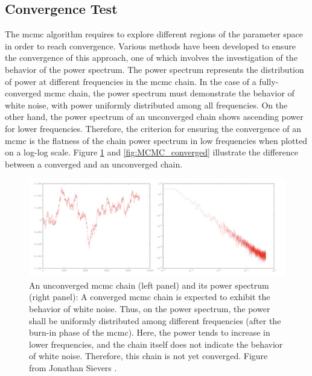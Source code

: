 \documentclass[12pt, TexShade, letterpaper]{report}
\begin{document}
\subsection{Convergence Test}
\label{chap:method,sub:mcmc,subsub:convergence}
The \gls{mcmc} algorithm requires to explore different regions of the parameter space in order to reach convergence. Various methods have been developed to ensure the convergence of this approach, one of which involves the investigation of the behavior of the power spectrum. The power spectrum represents the distribution of power at different frequencies in the \gls{mcmc} chain. In the case of a fully-converged \gls{mcmc} chain, the power spectrum must demonstrate the behavior of white noise, with power uniformly distributed among all frequencies. On the other hand, the power spectrum of an unconverged chain shows ascending power for lower frequencies. Therefore, the criterion for ensuring the convergence of an \gls{mcmc} is the flatness of the chain power spectrum in low frequencies when plotted on a log-log scale. Figure \ref{fig:MCMC_unconverged} and \ref{fig:MCMC_converged} illustrate the difference between a converged and an unconverged chain.\par
\begin{figure}[h!]
\centering
\includegraphics[scale =0.9]{mcmc_uncoverged.jpg}
\caption[An unconverged \gls{mcmc} chain and its power spectrum]{An unconverged \gls{mcmc} chain (left panel) and its power spectrum (right panel): A converged \gls{mcmc} chain is expected to exhibit the behavior of white noise. Thus, on the power spectrum, the power shall be uniformly distributed among different frequencies (after the burn-in phase of the \gls{mcmc}). Here, the power tends to increase in lower frequencies, and the chain itself does not indicate the behavior of white noise. Therefore, this chain is not yet converged. Figure from Jonathan Sievers \cite{mcmc_convergence_plot}.}
\label{fig:MCMC_unconverged}
\end{figure}
\end{document}

